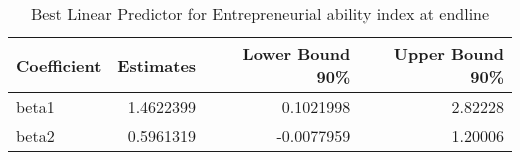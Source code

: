 \begin{table}

\caption{\label{tab:blpQEntrep_total}Best Linear Predictor for Entrepreneurial ability index at endline}
\centering
\begin{tabular}[t]{lrrr}
\toprule
Coefficient & Estimates & Lower Bound 90\% & Upper Bound 90\%\\
\midrule
beta1 & 1.4622399 & 0.1021998 & 2.82228\\
beta2 & 0.5961319 & -0.0077959 & 1.20006\\
\bottomrule
\end{tabular}
\end{table}
